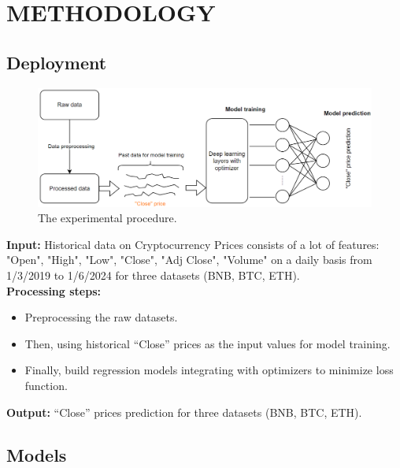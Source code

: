 \documentclass{ieeeojies}
\begin{document}
\section{METHODOLOGY}
\subsection{Deployment}
\begin{figure}[H]
  \centering
  \begin{minipage}{0.9\linewidth}
    \centering
    \includegraphics[width=\linewidth]{image/Deployment.png}
    \caption{The experimental procedure.}
    \label{fig8}
  \end{minipage}
\end{figure}
\textbf{Input:} Historical data on Cryptocurrency Prices consists of a lot of features: "Open", "High", "Low", "Close", "Adj Close", "Volume" on a daily basis from 1/3/2019 to 1/6/2024 for three datasets (BNB, BTC, ETH).\\
\textbf{Processing steps:} 
    \begin{itemize}
        \item Preprocessing the raw datasets.
        \item Then, using historical “Close” prices as the input values for model training.
        \item Finally, build regression models integrating with optimizers to minimize loss function.
    \end{itemize}
\textbf{Output:} “Close” prices prediction for three datasets (BNB, BTC, ETH).

\subsection{Models}
\end{document}
